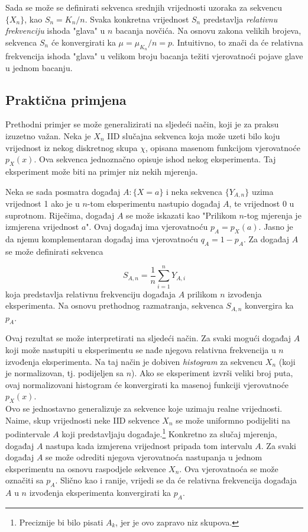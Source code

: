 Sada se može se definirati sekvenca srednjih vrijednosti uzoraka za sekvencu
$\{X_n\}$, kao $S_n = K_n / n$. Svaka konkretna vrijednost $S_n$ predstavlja
\textit{relativnu frekvenciju} ishoda "glava" u $n$ bacanja novčića. Na osnovu
zakona velikih brojeva, sekvenca $S_n$ će konvergirati ka $\mu = \mu_{K_n}/n =
p$.  Intuitivno, to znači da će relativna frekvencija ishoda "glava" u velikom
broju bacanja težiti vjerovatnoći pojave glave u jednom bacanju.

\subsection{Praktična primjena}

Prethodni primjer se može generalizirati na sljedeći način, koji je za praksu
izuzetno važan. Neka je $X_n$ IID slučajna sekvenca koja može uzeti bilo koju
vrijednost iz nekog diskretnog skupa $\chi$, opisana masenom funkcijom
vjerovatnoće $p_{X}(x)$. Ova sekvenca jednoznačno opisuje ishod nekog
eksperimenta. Taj eksperiment može biti na primjer niz nekih mjerenja.

Neka se sada posmatra događaj $A:\{X=a\}$ i neka sekvenca $\{Y_{A,n}\}$ uzima
vrijednost 1 ako je u $n$-tom eksperimentu nastupio događaj $A$, te vrijednost 0
u suprotnom. Riječima, događaj $A$ se može iskazati kao "Prilikom $n$-tog
mjerenja je izmjerena vrijednost $a$". Ovaj događaj ima vjerovatnoću
$p_A=p_X(a)$. Jasno je da njemu komplementaran događaj ima vjerovatnoću
$q_A=1-p_A$. Za događaj $A$ se može definirati sekvenca

\begin{equation}
    S_{A,n} = \frac{1}{n}\sum_{i=1}^{n} Y_{A,i}
\end{equation}
%
koja predstavlja relativnu frekvenciju događaja $A$ prilikom $n$ izvođenja
eksperimenta. Na osnovu prethodnog razmatranja, sekvenca $S_{A,n}$ konvergira ka
$p_A$.

Ovaj rezultat se može interpretirati na sljedeći način. Za svaki mogući događaj
$A$ koji može nastupiti u eksperimentu se nađe njegova relativna frekvencija u
$n$ izvođenja eksperimenta. Na taj način je dobiven \textit{histogram} za
sekvencu $X_n$ (koji je normalizovan, tj. podijeljen sa $n$). Ako se eksperiment
izvrši veliki broj puta, ovaj normalizovani histogram će konvergirati ka masenoj
funkciji vjerovatnoće $p_X(x)$. \\

Ovo se jednostavno generalizuje za sekvence koje uzimaju realne vrijednosti.
Naime, skup vrijednosti neke IID sekvence $X_n$ se može uniformno podijeliti na
podintervale $A$ koji predstavljaju događaje.\footnote{Preciznije bi bilo pisati
$A_k$, jer je ovo zapravo niz skupova.} Konkretno za slučaj mjerenja, događaj
$A$ nastupa kada izmjerena vrijednost pripada tom intervalu $A$. Za svaki
događaj $A$ se može odrediti njegova vjerovatnoća nastupanja u jednom
eksperimentu na osnovu raspodjele sekvence $X_n$. Ova vjerovatnoća se može
označiti sa $p_A$. Slično kao i ranije, vrijedi se da će relativna frekvencija
događaja $A$ u $n$ izvođenja eksperimenta konvergirati ka $p_A$.


